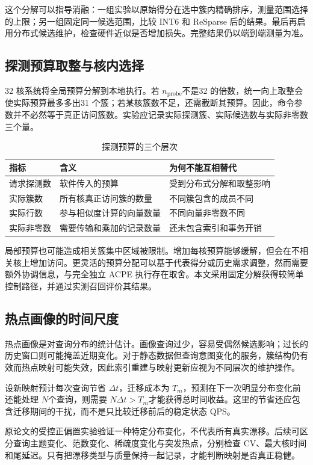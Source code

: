 这个分解可以指导消融：一组实验以原始得分在选中簇内精确排序，测量范围选择的上限；另一组固定同一候选范围，比较 INT6 和 ReSparse 后的结果。最后再启用分布式候选维护，检查硬件近似是否增加损失。完整结果仍以端到端测量为准。

\subsection{探测预算取整与核内选择}
32 核系统将全局预算分解到本地执行。若 $n_{\mathrm{probe}}$不是32 的倍数，统一向上取整会使实际预算最多多出31 个簇；若某核簇数不足，还需截断其预算。因此，命令参数并不必然等于真正访问簇数。实验应记录实际探测簇、实际候选数与实际非零数三个量。

\begin{table}[htbp]\centering\caption{探测预算的三个层次}
\begin{tabularx}{\textwidth}{p{2.5cm}XX}\toprule
指标&含义&为何不能互相替代\\\midrule
请求探测数&软件传入的预算&受到分布式分解和取整影响\\
实际簇数&所有核真正访问簇的数量&不同簇包含的成员不同\\
实际行数&参与相似度计算的向量数量&不同向量非零数不同\\
实际非零数&需要传输和乘加的记录数量&还未包含索引和事务开销\\\bottomrule
\end{tabularx}\end{table}

局部预算也可能造成相关簇集中区域被限制。增加每核预算能够缓解，但会在不相关核上增加访问。更灵活的预算分配可以基于代表得分或历史需求调整，然而需要额外协调信息，与完全独立 ACPE 执行存在取舍。本文采用固定分解获得较简单控制路径，并通过实测召回评价其结果。

\subsection{热点画像的时间尺度}
热点画像是对查询分布的统计估计。画像查询过少，容易受偶然候选影响；过长的历史窗口则可能掩盖近期变化。对于静态数据但查询意图变化的服务，簇结构仍有效而热点映射可能失效，因此索引重建与映射更新应视为不同层次的维护操作。

设新映射预计每次查询节省 $\Delta t$，迁移成本为 $T_m$，预测在下一次明显分布变化前还能处理 $N$个查询，则需要 $N\Delta t>T_m$才能获得总时间收益。这里的节省还应包含迁移期间的干扰，而不是只比较迁移前后的稳定状态 QPS。

原论文的受控正偏置实验验证一种特定分布变化，不代表所有真实漂移。后续可区分查询主题变化、范数变化、稀疏度变化与突发热点，分别检查 CV、最大核时间和尾延迟。只有把漂移类型与质量保持一起记录，才能判断映射是否真正稳健。

